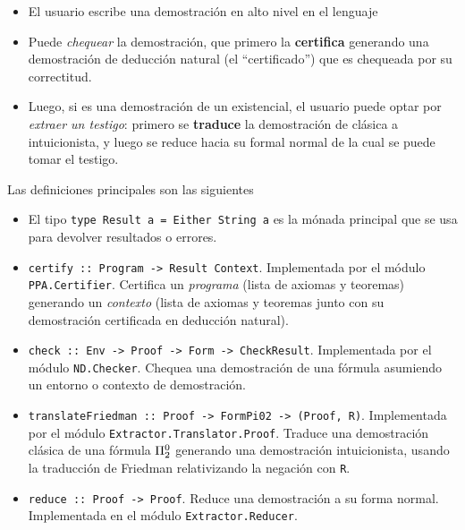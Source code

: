 \begin{itemize}
    \item El usuario escribe una demostración en alto nivel en el lenguaje \ppaLang{}
    \item Puede \textit{chequear} la demostración, que primero la \textbf{certifica} generando una demostración de deducción natural (el ``certificado'') que es chequeada por su correctitud.
    \item Luego, si es una demostración de un existencial, el usuario puede optar por \textit{extraer un testigo}: primero se \textbf{traduce} la demostración de clásica a intuicionista, y luego se reduce hacia su formal normal de la cual se puede tomar el testigo.
\end{itemize}

Las definiciones principales son las siguientes

\begin{itemize}
    \item El tipo \texttt{type Result a = Either String a} es la mónada principal que se usa para devolver resultados o errores.
    \item \texttt{certify :: Program -> Result Context}. Implementada por el módulo \texttt{PPA.Certifier}. Certifica un \textit{programa} (lista de axiomas y teoremas) generando un \textit{contexto} (lista de axiomas y teoremas junto con su demostración certificada en deducción natural).
    \item \texttt{check :: Env -> Proof -> Form -> CheckResult}.
    Implementada por el módulo \texttt{ND.Checker}. Chequea una demostración de una fórmula asumiendo un entorno o contexto de demostración.
    \item \texttt{translateFriedman :: Proof -> FormPi02 -> (Proof, R)}. Implementada por el módulo \texttt{Extractor.Translator.Proof}. Traduce una demostración clásica de una fórmula $\Pi^0_{2}$ generando una demostración intuicionista, usando la traducción de Friedman relativizando la negación con \texttt{R}.
    \item \texttt{reduce :: Proof -> Proof}. Reduce una demostración a su forma normal. Implementada en el módulo \texttt{Extractor.Reducer}.
\end{itemize}

